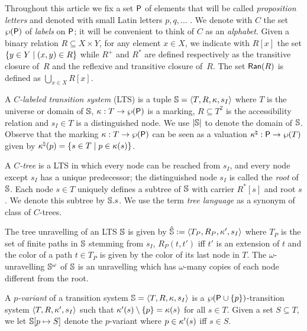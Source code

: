 Throughout this article we fix a set $\mathsf{P}$ of elements that will be called
\emph{proposition letters} and denoted with small Latin letters $p, q, \ldots$ .
We denote with $C$ the set $\wp (\mathsf{P})$ of \emph{labels} on $\mathsf{P}$; it will be
convenient to think of $C$ as an \emph{alphabet}.
Given a binary relation $R \subseteq X \times Y$, for any element $x \in X$,
we indicate with $R[x]$ the set $\{ y \in Y \mid (x,y) \in R\}$ while $R^+$
and $R^{*}$ are defined respectively as the transitive closure of~$R$ and
the reflexive and transitive closure of~$R$. The set $\mathsf{Ran}(R)$ is defined as $\bigcup_{x\in X}R[x]$.

A \emph{$C$-labeled transition system} (LTS) is a tuple $\mathbb{S} = \langle{T,R,\kappa,s_I}\rangle$ where
$T$ is the universe or domain of $\mathbb{S}$, $\kappa:T\to\wp(\mathsf{P})$ is a marking,
$R\subseteq T^2$ is the accessibility relation and $s_I \in T$ is a distinguished node.
We use $|\mathbb{S}|$ to denote the domain of $\mathbb{S}$.
%
Observe that the marking ${\kappa:T\to\wp(\mathsf{P})}$ can be seen as a valuation $\kappa^\natural:\mathsf{P}\to\wp (T)$ given by $\kappa^\natural(p) = \{s \in T \mid p\in \kappa(s)\}$.

%
A \emph{$C$-tree} is a LTS in which every node can
be reached from $s_I$, and every node except $s_I$ has a unique predecessor;
the distinguished node $s_I$ is called the \emph{root} of $\mathbb{S}$.
Each node $s \in T$ uniquely defines a subtree of $\mathbb{S}$ with carrier
$R^{*}[s]$ and root $s$. We denote this subtree by ${\mathbb{S}.s}$.
We use the term \emph{tree language} as a synonym of class of $C$-trees.

The tree unravelling of an LTS $\mathbb{S}$ is given by $\hat{\mathbb{S}} := \langle{T_P,R_P,\kappa',s_I}\rangle$ where $T_P$ is the set of finite paths in $\mathbb{S}$ stemming from $s_I$, $R_P(t,t')$ iff $t'$ is an extension of $t$ and the color of a path $t\in T_P$ is given by the color of its last node in $T$. The $\omega$-unravelling ${\mathbb{S}}^\omega$ of $\mathbb{S}$ is an unravelling which has $\omega$-many copies of each node different from the root.

A \emph{$p$-variant} of a transition system $\mathbb{S} = \langle{T,R,\kappa,s_I}\rangle$
is a $\wp (\mathsf{P}\cup\{p\})$-transition system $\langle{T,R,\kappa',s_I}\rangle$
such that $\kappa'(s)\setminus\{p\} = \kappa(s)$ for all $s \in T$.
Given a set $S \subseteq T$, we let $\mathbb{S}[p\mapsto S]$ denote the $p$-variant
where $p \in \kappa'(s)$ iff $s \in S$.

